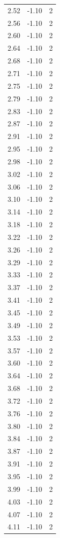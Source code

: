 \begin{longtable}{lrr}
  2.52 & -1.10 & 2 \\
  2.56 & -1.10 & 2 \\
  2.60 & -1.10 & 2 \\
  2.64 & -1.10 & 2 \\
  2.68 & -1.10 & 2 \\
  2.71 & -1.10 & 2 \\
  2.75 & -1.10 & 2 \\
  2.79 & -1.10 & 2 \\
  2.83 & -1.10 & 2 \\
  2.87 & -1.10 & 2 \\
  2.91 & -1.10 & 2 \\
  2.95 & -1.10 & 2 \\
  2.98 & -1.10 & 2 \\
  3.02 & -1.10 & 2 \\
  3.06 & -1.10 & 2 \\
  3.10 & -1.10 & 2 \\
  3.14 & -1.10 & 2 \\
  3.18 & -1.10 & 2 \\
  3.22 & -1.10 & 2 \\
  3.26 & -1.10 & 2 \\
  3.29 & -1.10 & 2 \\
  3.33 & -1.10 & 2 \\
  3.37 & -1.10 & 2 \\
  3.41 & -1.10 & 2 \\
  3.45 & -1.10 & 2 \\
  3.49 & -1.10 & 2 \\
  3.53 & -1.10 & 2 \\
  3.57 & -1.10 & 2 \\
  3.60 & -1.10 & 2 \\
  3.64 & -1.10 & 2 \\
  3.68 & -1.10 & 2 \\
  3.72 & -1.10 & 2 \\
  3.76 & -1.10 & 2 \\
  3.80 & -1.10 & 2 \\
  3.84 & -1.10 & 2 \\
  3.87 & -1.10 & 2 \\
  3.91 & -1.10 & 2 \\
  3.95 & -1.10 & 2 \\
  3.99 & -1.10 & 2 \\
  4.03 & -1.10 & 2 \\
  4.07 & -1.10 & 2 \\
  4.11 & -1.10 & 2 \\

\end{longtable}
